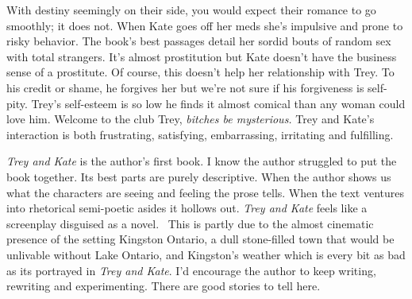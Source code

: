 With destiny seemingly on their side, you would expect their romance to
go smoothly; it does not. When Kate goes off her meds she's impulsive
and prone to risky behavior. The book's best passages detail her sordid
bouts of random sex with total strangers. It's almost prostitution but
Kate doesn't have the business sense of a prostitute. Of course, this
doesn't help her relationship with Trey. To his credit or shame, he
forgives her but we're not sure if his forgiveness is self-pity. Trey's
self-esteem is so low he finds it almost comical than any woman could
love him. Welcome to the club Trey, \emph{bitches be mysterious.} Trey
and Kate's interaction is both frustrating, satisfying, embarrassing,
irritating and fulfilling.

\emph{Trey and Kate} is the author's first book. I know the author
struggled to put the book together. Its best parts are purely
descriptive. When the author shows us what the characters are seeing and
feeling the prose tells. When the text ventures into rhetorical
semi-poetic asides it hollows out. \emph{Trey and Kate} feels like a
screenplay disguised as a novel.~ This is partly due to the almost
cinematic presence of the setting Kingston Ontario, a dull stone-filled
town that would be unlivable without Lake Ontario, and Kingston's
weather which is every bit as bad as its portrayed in \emph{Trey and
Kate}. I'd encourage the author to keep writing, rewriting and
experimenting. There are good stories to tell here.



%

